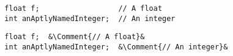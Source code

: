 \documentclass{article}
\newcommand*{\Comment}[1]{\hfill\makebox[3.0cm][l]{#1}}%
\begin{document}
\begin{lstlisting}
  float f;                  // A float
  int anAptlyNamedInteger;  // An integer
\end{lstlisting}


\lstset{columns=fullflexible}

\begin{lstlisting}
  float f;  &\Comment{// A float}&
  int anAptlyNamedInteger;  &\Comment{// An integer}&
\end{lstlisting}
\end{document}
